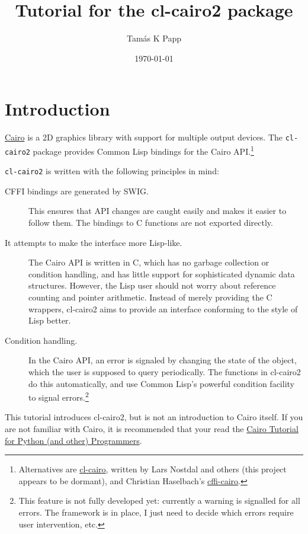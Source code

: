 \documentclass[12pt,letterpaper]{article}
\begin{document}
\title{Tutorial for the cl-cairo2 package}
\author{Tam\'as K Papp}
\date{\today}
\maketitle

\section{Introduction}
\label{sec:introduction}

\href{http://cairographics.org/}{Cairo} is a 2D graphics library with
support for multiple output devices.  The \lstinline!cl-cairo2!
package provides Common Lisp bindings for the Cairo API.\footnote{Alternatives
are \href{http://www.cliki.net/cl-cairo}{cl-cairo}, written by Lars
Nostdal and others (this project appears to be dormant), and Christian
Haselbach's \href{http://www.cliki.net/cffi-cairo}{cffi-cairo}.}

\lstinline!cl-cairo2! is written with the following principles in mind:

\begin{description}
\item[CFFI bindings are generated by SWIG.]  This ensures that API
  changes are caught easily and makes it easier to follow them.
  The bindings to C functions are not exported directly.
\item[It attempts to make the interface more Lisp-like.]  The Cairo
  API is written in C, which has no garbage collection or condition
  handling, and has little support for sophisticated dynamic data
  structures.  However, the Lisp user should not worry about reference
  counting and pointer arithmetic.  Instead of merely providing the C
  wrappers, cl-cairo2 aims to provide an interface conforming to the
  style of Lisp better.
\item[Condition handling.]  In the Cairo API, an error is signaled by
  changing the state of the object, which the user is supposed to
  query periodically.  The functions in cl-cairo2 do this
  automatically, and use Common Lisp's powerful condition facility to
  signal errors.\footnote{This feature is not fully developed yet:
    currently a warning is signalled for all errors.  The framework is
    in place, I just need to decide which errors require user
    intervention, etc.}
\end{description}

This tutorial introduces cl-cairo2, but is not an introduction to
Cairo itself.  If you are not familiar with Cairo, it is recommended
that your read the
\href{http://www.tortall.net/mu/wiki/CairoTutorial}{Cairo Tutorial for
  Python (and other) Programmers}.
\end{document}
